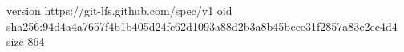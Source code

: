 version https://git-lfs.github.com/spec/v1
oid sha256:94d4a4a7657f4b1b405d24fc62d1093a88d2b3a8b45bcee31f2857a83c2cc4d4
size 864
